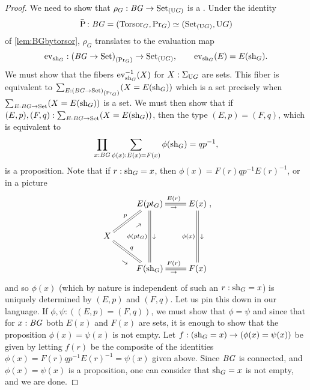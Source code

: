 \begin{proof}
  We need to show that $\rho_G:\mathit{B}\mathit{G}\to {{\mathrm{Set}}_{\left(\mathrm{U}G\right)}}$ is a
  \covering.
  Under the identity
  $$\bar{\pathsp{}}:\BG=(\typetorsor_G,\princ G)\oldequiv (\conncomp{\Set}{\USym G},\USym G)$$ of
  \cref{lem:BGbytorsor}, $\rho_G$ translates to the
  evaluation map
  $$\mathrm{ev}_{\mathrm{sh}_G}:{{(\mathit{B}\mathit{G}\to\mathrm{Set})}_{\left(\mathrm{Pr}_{{G}}\right)}}\to{{\mathrm{Set}}_{\left(\mathrm{U}G\right)}},\qquad
  \mathrm{ev}_{\mathrm{sh}_G}(E)=E(\mathrm{sh}_G).$$
  We must show that the fibers
  $\inv{\ev_{\sh_G}}(X)$ for $X:\Sigma_{\mathrm{U} G}$ are sets.  This
  fiber is equivalent to
  $\sum_{E:{{(\mathit{B}\mathit{G}\to\mathrm{Set})}_{\left(\mathrm{Pr}_{{G}}\right)}}}(X=E(\mathrm{sh}_G))$ which is a
  set precisely when $\sum_{E:\mathit{B}\mathit{G}\to\mathrm{Set}}(X=E(\mathrm{sh}_G))$ is a set.  We
  must then show that if $(E,p),(F,q):\sum_{E:\mathit{B}\mathit{G}\to\mathrm{Set}}(X=E(\mathrm{sh}_G))$,
  then the type $(E,p)=(F,q)$, which is equivalent
  to
  $$\prod_{x:\mathit{B}\mathit{G}}\sum_{\phi(x):E(x)=F(x)}\phi(\mathrm{sh}_G)=qp^{-1},$$
  is a proposition.  Note that if $r:\mathrm{sh}_G=x$, then
  $\phi(x)=F(r)qp^{-1}E(r)^{-1}$, or in a picture
  \begin{displaymath}
    \xymatrix{&E(pt_G)\ar@{=}[r]^{E(r)}_\to\ar@{=}[dd]_{\phi(pt_G)}^\downarrow&E(x)\ar@{=}[dd]_{\phi(x)}^\downarrow\\
      X\ar@{=}[ur]^p_{\rotatebox{35}{\footnotesize$\to$}}\ar@{=}[dr]^q_{\rotatebox{-35}{\footnotesize$\to$}}&&\\
      &F(\sh_G)\ar@{=}[r]^{F(r)}_\to&F(x)},
  \end{displaymath}
  and so $\phi(x)$ (which by nature is independent of such an
  $r:\mathrm{sh}_G=x$) is uniquely determined by $(E,p)$ and $(F,q)$.  Let us
  pin this down in our language.  If $\phi,\psi:((E,p)=(F,q))$, we
  must show that $\phi=\psi$ and since that for $x:\mathit{B}\mathit{G}$ both $E(x)$ and
  $F(x)$ are sets, it is enough to show that the proposition
  $\phi(x)=\psi(x)$ is not empty.  Let
  $f:(\mathrm{sh}_G=x)\to(\phi(x)=\psi(x))$ be given by letting $f(r)$ be the
  composite of the identities $\phi(x)=F(r)qp^{-1}E(r)^{-1}=\psi(x)$
  given above.  Since $\mathit{B}\mathit{G}$ is connected, and $\phi(x)=\psi(x)$ is a
  proposition, one can consider that $\mathrm{sh}_G=x$ is not empty, and we
  are done.
\end{proof}


